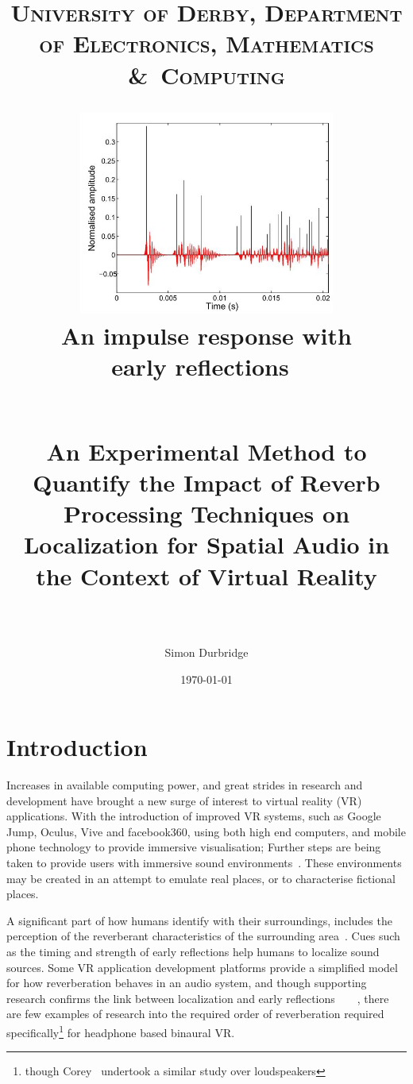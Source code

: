 \documentclass[paper=a4, fontsize=10pt, font=arial]{scrartcl} %
\title{	
\normalfont \normalsize 
\textsc{University of Derby, Department of Electronics, Mathematics \&\ Computing} \\ [25pt] %
\begin{figure}[H]
\centering
\includegraphics[width=0.75\textwidth]{impulseresponse.jpg}
\centering
\caption{An impulse response with early reflections~\cite{Mourik2013}}
\end{figure}
\horrule{0.5pt} \\[0.4cm] %
\huge An Experimental Method to Quantify the Impact of Reverb Processing Techniques on Localization for Spatial Audio in the Context of Virtual Reality \\ %
\horrule{2pt} \\[0.5cm] %
}
\author{Simon Durbridge} %
\date{\normalsize\today} %
\numberwithin{equation}{section} %
\numberwithin{figure}{section} %
\numberwithin{table}{section} %
\begin{document}
\maketitle %


\tableofcontents



\listoffigures

\newpage





\section{Introduction}

Increases in available computing power, and great strides in research and development have brought a new surge of interest to virtual reality (VR) applications. 
With the introduction of improved VR systems, such as Google Jump, Oculus, Vive and facebook360, using both high end computers, and mobile phone technology to provide immersive visualisation; Further steps are being taken to provide users with immersive sound environments~\cite{OculusCo41online}. 
These environments may be created in an  attempt to emulate real places, or to characterise fictional places.\par

A significant part of how humans identify with their surroundings, includes the perception of the reverberant characteristics of the surrounding area~\cite{rumsey2012spatial}. 
Cues such as the timing and strength of early reflections help humans to localize sound sources. 
Some VR application development platforms provide a simplified model for how reverberation behaves in an audio system, and though supporting research confirms the link between localization and early reflections~\cite{Begault1995}~\cite{rumsey2012spatial}~\cite{Blauert1997}~\cite{Wiggins2004}, there are few examples of research into the required order of reverberation required specifically\footnote{though Corey~\cite{Corey2002} undertook a similar study over loudspeakers} for headphone based binaural VR.\par
\end{document}
